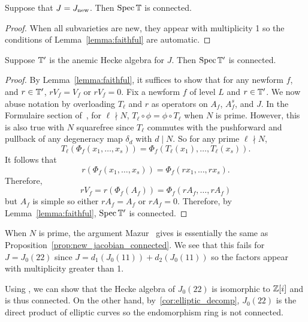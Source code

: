 \documentclass[11pt, proquest]{uwthesis}
\begin{document}
\begin{proposition}\label{prop:new_jacobian_connected} 
    Suppose that $J=J_{\operatorname{new}}$. Then $\operatorname{Spec}\mathbb{T}$ is connected.
\end{proposition}
\begin{proof}
    When all subvarieties are new, they appear with multiplicity 1 so the
    conditions of Lemma~\ref{lemma:faithful} are automatic.
\end{proof}

\begin{proposition}
    Suppose $\mathbb{T}'$ is the anemic Hecke algebra for $J$. Then $\operatorname{Spec}\mathbb{T}'$ is
    connected.
\end{proposition}
\begin{proof}
    By Lemma~\ref{lemma:faithful}, it suffices to show that for any newform
    $f$, and $r\in \mathbb{T}'$, $rV_f=V_f$ or $rV_f=0$. Fix a newform $f$ of level
    $L$ and $r\in \mathbb{T}'$. We now abuse notation by overloading $T_\ell$ and $r$
    as operators on $A_f$, $A_f^s$, and $J$. In the Formulaire section
    of~\cite{ribet:old}, for $\ell\nmid N$, $T_\ell\circ \phi=\phi\circ T_\ell$
    when $N$ is prime. However, this is also true with $N$ squarefree since
    $T_\ell$ commutes with the pushforward and pullback of any degeneracy map
    $\delta_d$ with $d\mid N$. So for any prime $\ell\nmid N$, 
    \[
        T_\ell(\Phi_f(x_1,\ldots,x_s))
        = \Phi_f(T_\ell(x_1),\ldots,T_\ell(x_s)).
    \]
    It follows that
    \[
        r(\Phi_f(x_1,\ldots,x_s))
        = \Phi_f(rx_1,\ldots,rx_s).
    \]
    Therefore,
    \[
        rV_f = r(\Phi_f(A_f)) = \Phi_f(rA_f,\ldots,rA_f)
    \]
    but $A_f$ is simple so either $rA_f=A_f$ or $rA_f=0$. Therefore, by
    Lemma~\ref{lemma:faithful}, $\operatorname{Spec}\mathbb{T}'$ is connected.
\end{proof}

\begin{example}
    When $N$ is prime, the argument Mazur~\cite[Prop. 10.6]{mazur:eisenstein}
    gives is essentially the same as
    Proposition~\ref{prop:new_jacobian_connected}. We see that this fails for
    $J=J_0(22)$ since $J=d_1(J_0(11))+d_2(J_0(11))$ so the factors appear with
    multiplicity greater than 1.

    Using \sage, we can show that the Hecke algebra of $J_0(22)$ is isomorphic
    to $\mathbb{Z}[i]$ and is thus connected. On the other hand,
    by~\ref{cor:elliptic_decomp}, $J_0(22)$ is the direct product of elliptic
    curves so the endomorphism ring is not connected.
\end{example}
\end{document}
